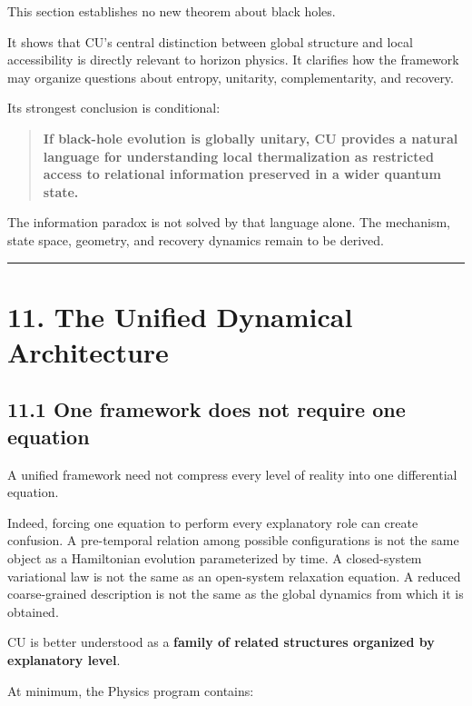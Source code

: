 \documentclass[
  11pt,
]{article}
\begin{document}
This section establishes no new theorem about black holes.

It shows that CU's central distinction between global structure and
local accessibility is directly relevant to horizon physics. It
clarifies how the framework may organize questions about entropy,
unitarity, complementarity, and recovery.

Its strongest conclusion is conditional:

\begin{quote}
\textbf{If black-hole evolution is globally unitary, CU provides a
natural language for understanding local thermalization as restricted
access to relational information preserved in a wider quantum state.}
\end{quote}

The information paradox is not solved by that language alone. The
mechanism, state space, geometry, and recovery dynamics remain to be
derived.

\begin{center}\rule{0.5\linewidth}{0.5pt}\end{center}

\section{11. The Unified Dynamical
Architecture}\label{the-unified-dynamical-architecture}

\subsection{11.1 One framework does not require one
equation}\label{one-framework-does-not-require-one-equation}

A unified framework need not compress every level of reality into one
differential equation.

Indeed, forcing one equation to perform every explanatory role can
create confusion. A pre-temporal relation among possible configurations
is not the same object as a Hamiltonian evolution parameterized by time.
A closed-system variational law is not the same as an open-system
relaxation equation. A reduced coarse-grained description is not the
same as the global dynamics from which it is obtained.

CU is better understood as a \textbf{family of related structures
organized by explanatory level}.

At minimum, the Physics program contains:
\end{document}

